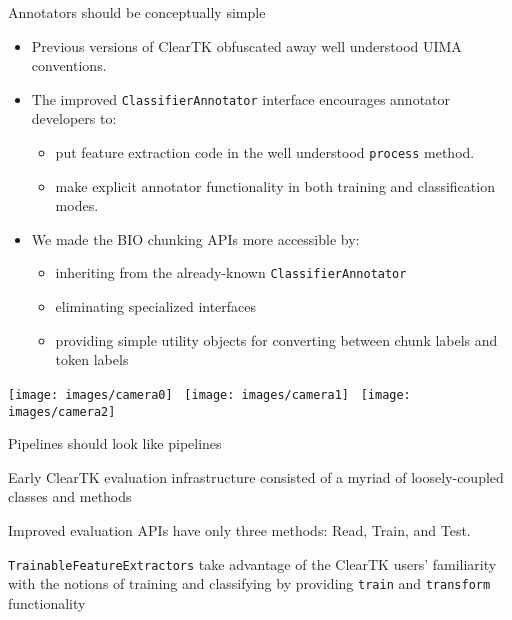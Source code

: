 \documentclass[final]{beamer}
\newcommand{\code}[1]{\texttt{\small #1}}
\begin{document}
\begin{frame}{}
\begin{columns}[t]
\begin{column}{.45\linewidth}
    \begin{block}{Annotators should be conceptually simple}
      \begin{itemize}
      \item Previous versions of ClearTK obfuscated away well understood UIMA conventions.
      \item The improved \code{ClassifierAnnotator} interface encourages annotator developers to:
        \begin{itemize}
        \item put feature extraction code in the well understood \code{process} method.
        \item make explicit annotator functionality in both training and classification modes.
        \end{itemize}
      \item We made the BIO chunking APIs more accessible by:
        \begin{itemize}
        \item inheriting from the already-known \code{ClassifierAnnotator}
        \item eliminating specialized interfaces
        \item providing simple utility objects for converting between chunk labels and token labels
        \end{itemize}
      \end{itemize}

      \begin{center}
        \texttt{[image: images/camera0]}
        \,
        \texttt{[image: images/camera1]}
        \,
        \texttt{[image: images/camera2]}
      \end{center}
    \end{block}

    \begin{block}{Pipelines should look like pipelines}
      \item Early ClearTK evaluation infrastructure consisted of a myriad of loosely-coupled classes and methods
      \item Improved evaluation APIs have only three methods: Read, Train, and Test.
      \item \code{TrainableFeatureExtractors} take advantage of the ClearTK users' familiarity with the notions of training and classifying by providing \code{train} and \code{transform} functionality
    \end{block}
    

\end{column}
\end{columns}
\end{frame}
\end{document}

